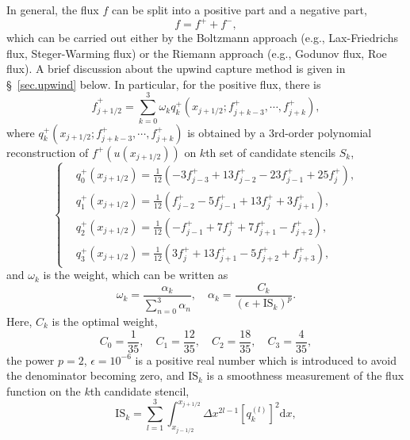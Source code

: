 \documentclass[review]{elsarticle}
\newcommand{\fr}{\frac}
\newcommand{\al}{\alpha}
\newcommand{\om}{\omega}
\newcommand{\ep}{\epsilon}
\begin{document}
In general, the flux $f$ can be split into a positive part and a negative part,
\begin{equation}\label{fmp}
  f = f^+ + f^-,
\end{equation}
which can be carried out either by the Boltzmann approach (e.g., Lax-Friedrichs flux, Steger-Warming flux) or the Riemann approach (e.g., Godunov flux, Roe flux). A brief discussion about the upwind capture method is given in \S~\ref{sec.upwind} below. In particular, for the positive flux, there is
\begin{equation}\label{2.10-96}
  \hat f^+_{j+1/2} = \sum_{k=0}^{3} \om_k q^+_k(x_{j+1/2}; f^+_{j+k-3}, \cdots, f^+_{j+k}),
\end{equation}
where $q^+_k(x_{j+1/2}; f^+_{j+k-3}, \cdots, f^+_{j+k})$ is obtained by a 3rd-order polynomial reconstruction of $f^+(u(x_{j+1/2}))$ on $k$th set of candidate stencils $S_k$,
\begin{equation}
 \left\{ \begin{split}
 & q^+_0(x_{j+1/2}) = \fr{1}{12} (-3 f^+_{j-3} + 13 f^+_{j-2} - 23 f^+_{j-1} + 25 f^+_{j}), \\
 & q^+_1(x_{j+1/2}) = \fr{1}{12} ( f^+_{j-2} - 5 f^+_{j-1} + 13 f^+_{j} + 3 f^+_{j+1}), \\
 & q^+_2(x_{j+1/2}) = \fr{1}{12} (-f^+_{j-1} + 7 f^+_{j} + 7 f^+_{j+1} - f^+_{j+2}), \\
 & q^+_3(x_{j+1/2}) = \fr{1}{12} ( 3 f^+_{j} + 13 f^+_{j+1} - 5 f^+_{j+2} + f^+_{j+3}),
 \end{split} \right.
\end{equation}
and $\om_k$ is the weight, which can be written as
\begin{equation}\label{2.15-96}
  \om_k = \fr{\al_k}{ \sum_{n=0}^3 \al_n}, \quad
  \al_k = \fr{C_k}{(\ep + \mathrm{IS}_k)^p}.
\end{equation}
Here, $C_k$ is the optimal weight,
\begin{equation}\label{c4}
  C_0 = \fr{1}{35}, \quad
  C_1 = \fr{12}{35}, \quad
  C_2 = \fr{18}{35}, \quad
  C_3 = \fr{4}{35},
\end{equation}
the power $p = 2$, $\ep = 10^{-6}$ is a positive real number which is introduced to avoid the denominator becoming zero, and $\mathrm{IS}_k$ is a smoothness measurement of the flux function on the $k$th candidate stencil,
\begin{equation}\label{3.1-96}
  \mathrm{IS}_k = \sum_{l=1}^{3} \int_{x_{j-1/2}}^{x_{j+1/2}} \Delta x^{2l-1} \left[ q_k^{(l)} \right]^2 \mathrm{d}x,
\end{equation}
\end{document}
